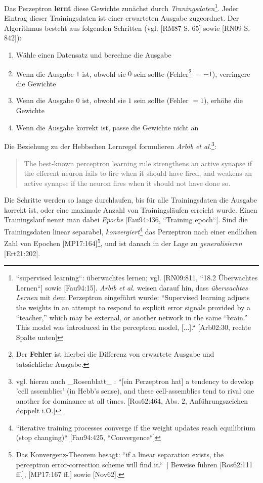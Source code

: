 Das Perzeptron \textbf{lernt} diese Gewichte zunächst durch \textit{Traningsdaten}\footnote{
    ``supervised learning``: überwachtes lernen; vgl. [RN09:811, ``18.2 Überwachtes Lernen``] sowie [Fau94:15]. \textit{Arbib et al.} weisen darauf hin, dass \textit{überwachtes Lernen} mit dem Perzeptron eingeführt wurde: ``Supervised learning adjusts the weights in an attempt to respond to explicit error signals provided by a “teacher,” which may be external, or another network in the same “brain.” This model was introduced in the perceptron model, [...].``  [Arb02:30, rechte Spalte unten]
}.
Jeder Eintrag dieser Trainingsdaten ist einer erwarteten Ausgabe zugeordnet. Der Algorithmus besteht aus folgenden Schritten (vgl. [RM87 S. 65] sowie [RN09 S. 842]):



\begin{enumerate}
    \item Wähle einen Datensatz und berechne die Ausgabe
    \item Wenn die Ausgabe $1$ ist, obwohl sie $0$ sein sollte (Fehler\footnote{
    Der \textbf{Fehler} ist hierbei die Differenz von $\text{erwartete Ausgabe}$ und $\text{tatsächliche Ausgabe}$.
    } $=-1$), verringere die Gewichte
    \item Wenn die Ausgabe $0$ ist, obwohl sie $1$ sein sollte  (Fehler $=1$), erhöhe die Gewichte
    \item Wenn die Ausgabe korrekt ist, passe die Gewichte nicht an
\end{enumerate}

\noindent
Die Beziehung zu der Hebbschen Lernregel formulieren \textit{Arbib et al.}\footnote{
    vgl. hierzu auch _Rosenblatt_ : ``[ein Perzeptron hat] a tendency to develop 'cell assemblies' (in Hebb's sense), and these cell-assemblies tend to rival one another for dominance at all times. [Ros62:464, Abs. 2, Anführungszeichen doppelt i.O.]
}:

\blockquote[{\cite[20]{Arb03}}]{
    The best-known perceptron learning rule strengthens an active synapse if the efferent neuron fails to fire when it should have fired, and weakens an active synapse if the neuron fires when it should not have done so.
}

\noindent
Die Schritte werden so lange durchlaufen, bis für alle Trainingsdaten die Ausgabe korrekt ist, oder eine maximale Anzahl von Trainingsläufen erreicht wurde.
Einen Trainingslauf nennt man dabei \textit{Epoche} [Fau94:436, ``Training epoch``].
Sind die Trainingsdaten linear separabel, \textit{konvergiert}\footnote{
    ``iterative training processes converge if the weight updates reach equilibrium (stop changing)`` [Fau94:425, ``Convergence``]
} das Perzeptron nach einer endlichen Zahl von Epochen [MP17:164]\footnote{
    Das Konvergenz-Theorem besagt: ``if a linear separation exists, the perceptron error-correction scheme will find it.``~\cite[20]{Arb03}] Beweise führen [Ros62:111 ff.], [MP17:167 ff.] sowie [Nov62].
}, und ist danach in der Lage zu \textit{generalisieren} [Ert21:202].\\

